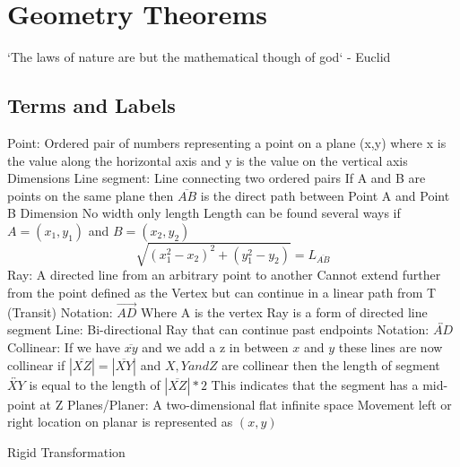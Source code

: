 \documentclass[12pt]{article}
\begin{document}
    \section {Geometry Theorems}
        `The laws of nature are but the mathematical though of god` - Euclid
        \subsection{Terms and Labels}
        \begin{outline}[enumerate]
            \1 Point: Ordered pair of numbers representing a point on a plane
                \2 (x,y) where x is the value along the horizontal axis and y is the value on the vertical axis
                 Dimensions
            \1 Line segment: Line connecting two ordered pairs
                \2 If A and B are points on the same plane then $\overline{AB}$ is the direct path between Point A and Point B
                 Dimension
                \2 No width only length
                \2 Length can be found several ways
                    \3 if $A = (x_1, y_1)$ and $B = (x_2, y_2)$
                    \begin{equation}
                        \sqrt{(x_1^2 - x_2)^2 + (y_1^2 - y_2)} = L_{\overline{AB}}
                    \end{equation}
            \1 Ray: A directed line from an arbitrary point to another
                \2 Cannot extend further from the point defined as the Vertex but can continue in a linear path from T (Transit)
                \2 Notation: $\overrightarrow{AD}$ Where A is the vertex
                \2 Ray is a form of directed line segment
            \1 Line: Bi-directional Ray that can continue past endpoints
                \2 Notation: $\overleftrightarrow{AD}$
            \1 Collinear: If we have $\overline{xy}$ and we add a z in between $x$ and $y$ these lines are now collinear
                \2 if $|\overline{XZ}| = |\overline{XY}|$ and $X, Y and Z$ are collinear then the
                length of segment $\overleftrightarrow{XY}$ is equal to the length of $|\overline{XZ}| * 2$
                \2 This indicates that the segment has a mid-point at Z
            \1 Planes/Planer: A two-dimensional flat infinite space
                \2 Movement left or right location on planar is represented as $(x, y)$
        \end{outline}
        \begin{outline}
            \1 Rigid Transformation
        \end{outline}
\end{document}

